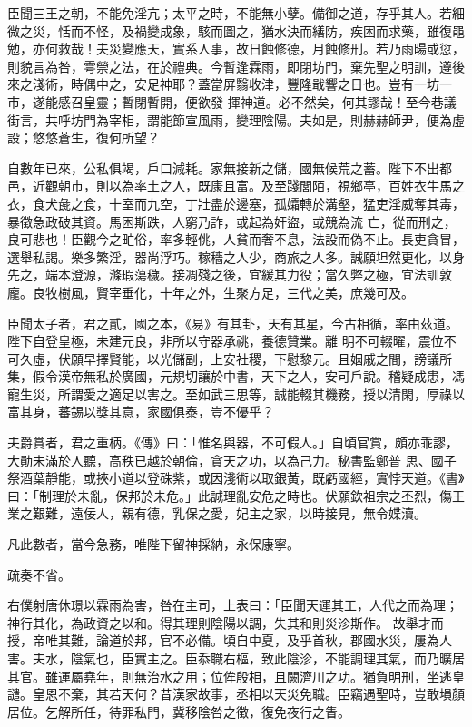 \begin{pinyinscope}
 臣聞三王之朝，不能免淫亢；太平之時，不能無小孽。備御之道，存乎其人。若細微之災，恬而不怪，及禍變成象，駭而圖之，猶水決而繕防，疾困而求藥，雖復黽勉，亦何救哉！夫災變應天，實系人事，故日蝕修德，月蝕修刑。若乃雨暘或愆，則貌言為咎，雩禜之法，在於禮典。今暫逢霖雨，即閉坊門，棄先聖之明訓，遵後來之淺術，時偶中之，安足神耶？蓋當屏翳收津，豐隆戢響之日也。豈有一坊一市，遂能感召皇靈；暫閉暫開，便欲發
 揮神道。必不然矣，何其謬哉！至今巷議街言，共呼坊門為宰相，謂能節宣風雨，變理陰陽。夫如是，則赫赫師尹，便為虛設；悠悠蒼生，復何所望？



 自數年已來，公私俱竭，戶口減耗。家無接新之儲，國無候荒之蓄。陛下不出都邑，近觀朝市，則以為率土之人，既康且富。及至踐閭陌，視鄉亭，百姓衣牛馬之衣，食犬彘之食，十室而九空，丁壯盡於邊塞，孤孀轉於溝壑，猛吏淫威奪其毒，暴徵急政破其資。馬困斯跌，人窮乃詐，或起為奸盜，或競為流
 亡，從而刑之，良可悲也！臣觀今之甿俗，率多輕佻，人貧而奢不息，法設而偽不止。長吏貪冒，選舉私謁。樂多繁淫，器尚浮巧。稼穡之人少，商旅之人多。誠願坦然更化，以身先之，端本澄源，滌瑕蕩穢。接凋殘之後，宜緩其力役；當久弊之極，宜法訓敦龐。良牧樹風，賢宰垂化，十年之外，生聚方足，三代之美，庶幾可及。



 臣聞太子者，君之貳，國之本，《易》有其卦，天有其星，今古相循，率由茲道。陛下自登皇極，未建元良，非所以守器承祧，養德贊業。離
 明不可輟曜，震位不可久虛，伏願早擇賢能，以光儲副，上安社稷，下慰黎元。且姻戚之間，謗議所集，假令漢帝無私於廣國，元規切讓於中書，天下之人，安可戶說。稽疑成患，馮寵生災，所謂愛之適足以害之。至如武三思等，誠能輟其機務，授以清閑，厚祿以富其身，蕃錫以獎其意，家國俱泰，豈不優乎？



 夫爵賞者，君之重柄。《傳》曰：「惟名與器，不可假人。」自頃官賞，頗亦乖謬，大勛未滿於人聽，高秩已越於朝倫，貪天之功，以為己力。秘書監鄭普
 思、國子祭酒葉靜能，或挾小道以登硃紫，或因淺術以取銀黃，既虧國經，實悖天道。《書》曰：「制理於未亂，保邦於未危。」此誠理亂安危之時也。伏願欽祖宗之丕烈，傷王業之艱難，遠佞人，親有德，乳保之愛，妃主之家，以時接見，無令媟瀆。



 凡此數者，當今急務，唯陛下留神採納，永保康寧。



 疏奏不省。



 右僕射唐休璟以霖雨為害，咎在主司，上表曰：「臣聞天運其工，人代之而為理；神行其化，為政資之以和。得其理則陰陽以調，失其和則災沴斯作。
 故舉才而授，帝唯其難，論道於邦，官不必備。頃自中夏，及乎首秋，郡國水災，屢為人害。夫水，陰氣也，臣實主之。臣忝職右樞，致此陰沴，不能調理其氣，而乃曠居其官。雖運屬堯年，則無治水之用；位侔殷相，且闕濟川之功。猶負明刑，坐逃皇譴。皇恩不棄，其若天何？昔漢家故事，丞相以天災免職。臣竊遇聖時，豈敢塤顏居位。乞解所任，待罪私門，冀移陰咎之徵，復免夜行之眚。




\end{pinyinscope}
